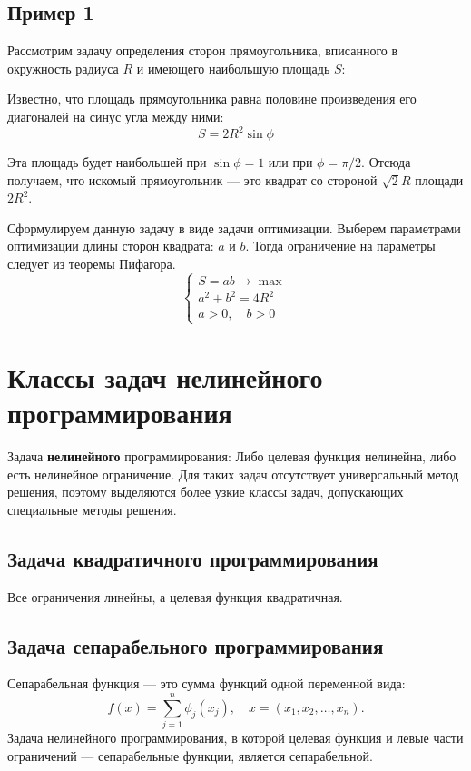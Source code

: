 \documentclass[17pt]{extarticle}
\begin{document}
\subsection{Пример 1}
Рассмотрим задачу определения сторон прямоугольника, вписанного в окружность радиуса \( R \) и имеющего наибольшую площадь \( S \):


Известно, что площадь прямоугольника равна половине произведения его диагоналей на синус угла между ними:
\[
    S = 2 R^2 \sin{\phi}
\]

Эта площадь будет наибольшей при \( \sin{\phi} = 1 \) или при \( \phi = \pi / 2 \). Отсюда получаем, что искомый прямоугольник — это квадрат со стороной \( \sqrt{2} R \) площади \( 2 R^2 \).

Сформулируем данную задачу в виде задачи оптимизации. Выберем параметрами оптимизации длины сторон квадрата: \( a \) и \( b \). Тогда ограничение на параметры следует из теоремы Пифагора.
\[
    \begin{cases}
        S = a b \to \max  \\
        a^2 + b^2 = 4 R^2 \\
        a > 0, \quad b > 0
    \end{cases}
\]




\section{Классы задач нелинейного программирования}

Задача \textbf{нелинейного} программирования:
Либо целевая функция нелинейна, либо есть нелинейное ограничение. Для таких задач отсутствует универсальный метод решения, поэтому выделяются более узкие классы задач, допускающих специальные методы решения.

\subsection{Задача квадратичного программирования}
Все ограничения линейны, а целевая функция квадратичная.

\subsection{Задача сепарабельного программирования}
Сепарабельная функция — это сумма функций одной переменной вида:
\[
    f(x) = \sum\limits_{j=1}^{n} \phi_j(x_j), \quad x = (x_1, x_2, \dots, x_n).
\]
Задача нелинейного программирования, в которой целевая функция и левые части ограничений — сепарабельные функции, является сепарабельной.
\end{document}
